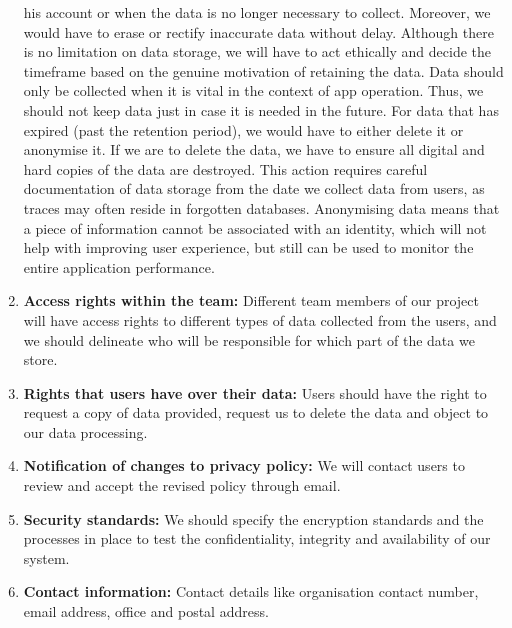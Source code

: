 \begin{enumerate}
    his account or when the data is no longer necessary to collect. Moreover, we would have to erase or rectify inaccurate data without delay. Although 
    there is no limitation on data storage, we will have to act ethically and
    decide the timeframe based on the genuine motivation of retaining the data. Data should only be collected when it is vital in the context
    of app operation. Thus, we should not keep data just in case it is needed in the future. For data that has expired (past the retention period), we 
    would have to either delete it or anonymise it. If we are to delete the data, we have to ensure all digital and hard copies of the data are destroyed. 
    This action requires careful documentation of data storage from the date we collect data from users, as traces may often reside in forgotten databases.
    Anonymising data means that a piece of information cannot be associated with an identity, which will not help with improving user experience, but still 
    can be used to monitor the entire application performance.
    \item \textbf{Access rights within the team:} Different team members of our project will have access rights to different types of data collected from
    the users, and we should delineate who will be responsible for which part of the data we store.
    \item \textbf{Rights that users have over their data:} Users should have the right to request a copy of data provided, request us to delete the data and object to our data processing.
    \item \textbf{Notification of changes to privacy policy:} We will contact users to review and accept the revised policy through email.
    \item \textbf{Security standards:} We should specify the encryption standards and the processes in place to test the confidentiality, integrity and availability of 
    our system.
    \item \textbf{Contact information:} Contact details like organisation contact number, email address, office and postal address.
\end{enumerate}

